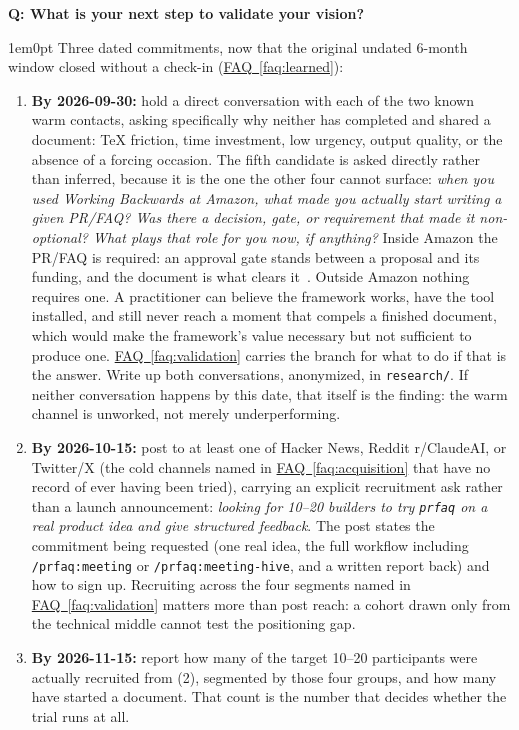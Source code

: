 \documentclass[11pt,letterpaper]{article}
\newcounter{faqnum}
\newenvironment{faqpair}[1]{%
  \needspace{4\baselineskip}%
  \vspace{0.5em}%
  \refstepcounter{faqnum}%
  \noindent\textbf{\color{SectionBlue}Q\thefaqnum: #1}\par\nopagebreak[4]%
  \vspace{0.2em}%
  \begin{adjustwidth}{1em}{0pt}%
  \setlength{\parindent}{0pt}%
}{%
  \end{adjustwidth}%
  \vspace{0.5em}%
}
\newcommand{\faqref}[1]{\hyperref[#1]{FAQ~\ref*{#1}}}
\begin{document}
\begin{faqpair}{What is your next step to validate your vision?}\label{faq:next-step}
  Three dated commitments, now that the original undated 6-month window closed without a check-in (\faqref{faq:learned}):

  \begin{enumerate}[nosep]
    \item[(1)] \textbf{By 2026-09-30:} hold a direct conversation with each of the two known warm contacts, asking specifically why neither has completed and shared a document: TeX friction, time investment, low urgency, output quality, or the absence of a forcing occasion. The fifth candidate is asked directly rather than inferred, because it is the one the other four cannot surface: \textit{when you used Working Backwards at Amazon, what made you actually start writing a given PR/FAQ? Was there a decision, gate, or requirement that made it non-optional? What plays that role for you now, if anything?} Inside Amazon the PR/FAQ is required: an approval gate stands between a proposal and its funding, and the document is what clears it~\cite{bryar2021workingbackwards}. Outside Amazon nothing requires one. A practitioner can believe the framework works, have the tool installed, and still never reach a moment that compels a finished document, which would make the framework's value necessary but not sufficient to produce one. \faqref{faq:validation} carries the branch for what to do if that is the answer. Write up both conversations, anonymized, in \texttt{research/}. If neither conversation happens by this date, that itself is the finding: the warm channel is unworked, not merely underperforming.
    \item[(2)] \textbf{By 2026-10-15:} post to at least one of Hacker News, Reddit r/ClaudeAI, or Twitter/X (the cold channels named in \faqref{faq:acquisition} that have no record of ever having been tried), carrying an explicit recruitment ask rather than a launch announcement: \textit{looking for 10--20 builders to try \texttt{prfaq} on a real product idea and give structured feedback}. The post states the commitment being requested (one real idea, the full workflow including \texttt{/prfaq:meeting} or \texttt{/prfaq:meeting-hive}, and a written report back) and how to sign up. Recruiting across the four segments named in \faqref{faq:validation} matters more than post reach: a cohort drawn only from the technical middle cannot test the positioning gap.
    \item[(3)] \textbf{By 2026-11-15:} report how many of the target 10--20 participants were actually recruited from (2), segmented by those four groups, and how many have started a document. That count is the number that decides whether the trial runs at all.
  \end{enumerate}


\end{faqpair}
\end{document}
